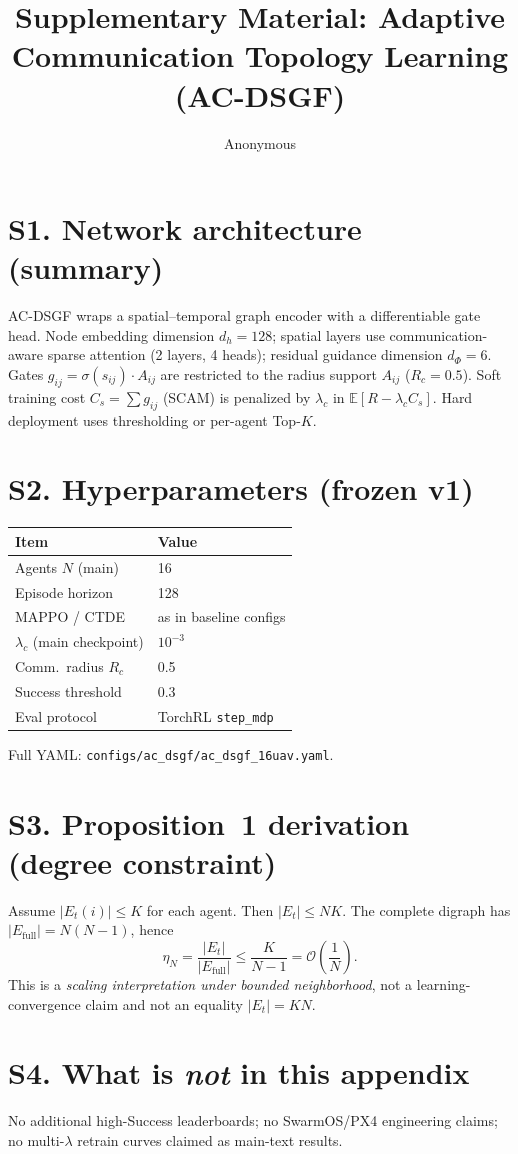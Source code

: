 \documentclass[letterpaper,10pt,journal]{IEEEtran}
\title{Supplementary Material: Adaptive Communication Topology Learning (AC-DSGF)}
\author{Anonymous}
\begin{document}
\maketitle

\section*{S1. Network architecture (summary)}
AC-DSGF wraps a spatial--temporal graph encoder with a differentiable gate head.
Node embedding dimension $d_h{=}128$; spatial layers use communication-aware
sparse attention (2 layers, 4 heads); residual guidance dimension $d_\Phi{=}6$.
Gates $g_{ij}=\sigma(s_{ij})\cdot A_{ij}$ are restricted to the radius support
$A_{ij}$ ($R_c{=}0.5$). Soft training cost $C_s=\sum g_{ij}$ (SCAM) is
penalized by $\lambda_c$ in $\mathbb{E}[R-\lambda_c C_s]$. Hard deployment uses
thresholding or per-agent Top-$K$.

\section*{S2. Hyperparameters (frozen v1)}
\begin{center}
\begin{tabular}{@{}ll@{}}
\toprule
Item & Value \\
\midrule
Agents $N$ (main) & 16 \\
Episode horizon & 128 \\
MAPPO / CTDE & as in baseline configs \\
$\lambda_c$ (main checkpoint) & $10^{-3}$ \\
Comm.\ radius $R_c$ & 0.5 \\
Success threshold & 0.3 \\
Eval protocol & TorchRL \texttt{step\_mdp} \\
\bottomrule
\end{tabular}
\end{center}
Full YAML: \texttt{configs/ac\_dsgf/ac\_dsgf\_16uav.yaml}.

\section*{S3. Proposition~1 derivation (degree constraint)}
Assume $|E_t(i)|\le K$ for each agent. Then $|E_t|\le NK$.
The complete digraph has $|E_{\mathrm{full}}|=N(N-1)$, hence
\[
\eta_N=\frac{|E_t|}{|E_{\mathrm{full}}|}\le\frac{K}{N-1}=\mathcal{O}\!\left(\frac1N\right).
\]
This is a \emph{scaling interpretation under bounded neighborhood}, not a
learning-convergence claim and not an equality $|E_t|=KN$.

\section*{S4. What is \emph{not} in this appendix}
No additional high-Success leaderboards; no SwarmOS/PX4 engineering claims;
no multi-$\lambda$ retrain curves claimed as main-text results.
\end{document}
